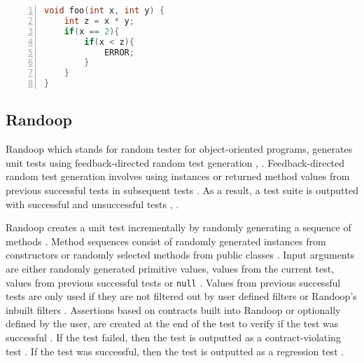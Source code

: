 
\begin{lstlisting}[language=C, tabsize=3, numbers=left,
label={lst:cuteExample}, caption={Example C program}, captionpos=b,
frame=single]
void foo(int x, int y) {
	int z = x * y;
	if(x == 2){
		if(x < z){
			ERROR;
		}
	}
}
\end{lstlisting}

\subsection{Randoop}
Randoop which stands for random tester for object-oriented programs, generates unit tests using feedback-directed random test generation \cite{randoopAll}, \cite{randoopJava}. 
Feedback-directed random test generation involves using instances or returned method values from previous successful tests in subsequent tests \cite{randoopJava}.
As a result, a test suite is outputted with successful and unsuccessful tests \cite{randoopAll}, \cite{randoopJava}.

Randoop creates a unit test incrementally by randomly generating a sequence of methods \cite{randoopAll}.
Method sequences consist of randomly generated instances from constructors or randomly selected methods from public classes \cite{randoopAll}.
Input arguments are either randomly generated primitive values, values from the current test, values from previous successful tests or \texttt{null} \cite{randoopAll}.
Values from previous successful tests are only used if they are not filtered out by user defined filters or Randoop's inbuilt filters \cite{randoopAll}.
Assertions based on contracts built into Randoop or optionally defined by the user, are created at the end of the test to verify if the test was successful \cite{randoopAll}.
If the test failed, then the test is outputted as a contract-violating test \cite{randoopAll}. 
If the test was successful, then the test is outputted as a regression test \cite{randoopAll}.



